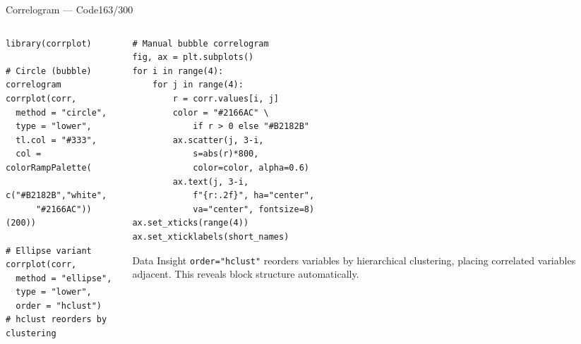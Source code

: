 \documentclass[10pt]{beamer}
\newcommand{\smark}[1]{\hfill{\scriptsize\color{codegray}#1}}
\begin{document}
\begin{frame}[fragile]{Correlogram --- Code}\smark{163/300}
\begin{columns}[T]
\begin{column}{0.48\textwidth}
\begin{lstlisting}[style=Rstyle]
library(corrplot)

# Circle (bubble) correlogram
corrplot(corr,
  method = "circle",
  type = "lower",
  tl.col = "#333",
  col = colorRampPalette(
    c("#B2182B","white",
      "#2166AC"))(200))

# Ellipse variant
corrplot(corr,
  method = "ellipse",
  type = "lower",
  order = "hclust")
# hclust reorders by clustering
\end{lstlisting}
\end{column}
\begin{column}{0.48\textwidth}
\begin{lstlisting}[style=Pystyle]
# Manual bubble correlogram
fig, ax = plt.subplots()
for i in range(4):
    for j in range(4):
        r = corr.values[i, j]
        color = "#2166AC" \
            if r > 0 else "#B2182B"
        ax.scatter(j, 3-i,
            s=abs(r)*800,
            color=color, alpha=0.6)
        ax.text(j, 3-i,
            f"{r:.2f}", ha="center",
            va="center", fontsize=8)
ax.set_xticks(range(4))
ax.set_xticklabels(short_names)
\end{lstlisting}
\vspace{0.1cm}
\begin{exampleblock}{Data Insight}
    \scriptsize \texttt{order="hclust"} reorders variables by hierarchical clustering, placing correlated variables adjacent. This reveals block structure automatically.
\end{exampleblock}
\end{column}
\end{columns}
\end{frame}
\end{document}
